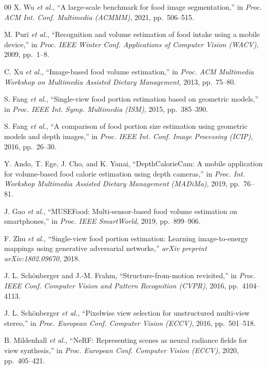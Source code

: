 \documentclass[conference]{IEEEtran}
\begin{document}
\begin{thebibliography}{00}
X. Wu \textit{et al.},
``A large-scale benchmark for food image segmentation,''
in \textit{Proc. ACM Int. Conf. Multimedia (ACMMM)}, 2021, pp.~506--515.

M. Puri \textit{et al.},
``Recognition and volume estimation of food intake using a mobile device,''
in \textit{Proc. IEEE Winter Conf. Applications of Computer Vision (WACV)},
2009, pp.~1--8.

C. Xu \textit{et al.},
``Image-based food volume estimation,''
in \textit{Proc. ACM Multimedia Workshop on Multimedia Assisted Dietary Management},
2013, pp.~75--80.

S. Fang \textit{et al.},
``Single-view food portion estimation based on geometric models,''
in \textit{Proc. IEEE Int. Symp. Multimedia (ISM)}, 2015, pp.~385--390.

S. Fang \textit{et al.},
``A comparison of food portion size estimation using geometric models and depth images,''
in \textit{Proc. IEEE Int. Conf. Image Processing (ICIP)}, 2016, pp.~26--30.

Y. Ando, T. Ege, J. Cho, and K. Yanai,
``DepthCalorieCam: A mobile application for volume-based food calorie estimation
using depth cameras,''
in \textit{Proc. Int. Workshop Multimedia Assisted Dietary Management (MADiMa)},
2019, pp.~76--81.

J. Gao \textit{et al.},
``MUSEFood: Multi-sensor-based food volume estimation on smartphones,''
in \textit{Proc. IEEE SmartWorld}, 2019, pp.~899--906.

F. Zhu \textit{et al.},
``Single-view food portion estimation: Learning image-to-energy mappings
using generative adversarial networks,''
\textit{arXiv preprint arXiv:1802.09670}, 2018.

J. L. Sch\"onberger and J.-M. Frahm,
``Structure-from-motion revisited,''
in \textit{Proc. IEEE Conf. Computer Vision and Pattern Recognition (CVPR)},
2016, pp.~4104--4113.

J. L. Sch\"onberger \textit{et al.},
``Pixelwise view selection for unstructured multi-view stereo,''
in \textit{Proc. European Conf. Computer Vision (ECCV)}, 2016, pp.~501--518.

B. Mildenhall \textit{et al.},
``NeRF: Representing scenes as neural radiance fields for view synthesis,''
in \textit{Proc. European Conf. Computer Vision (ECCV)}, 2020, pp.~405--421.


\end{thebibliography}
\end{document}
